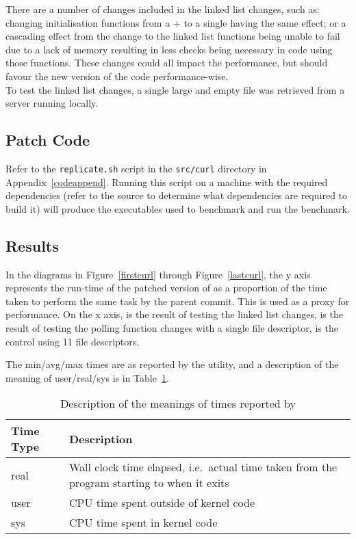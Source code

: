 There are a number of changes included in the linked list changes, such as: changing initialisation functions from a \malloc{}+ to a single  having the same effect; or a cascading effect from the change to the linked list functions being unable to fail due to a lack of memory resulting in less checks being necessary in code using those functions. These changes could all impact the performance, but should favour the new version of the code performance-wise.\\
To test the linked list changes, a single large and empty file was retrieved from a server running locally.

\subsection{Patch Code}

Refer to the \texttt{replicate.sh} script in the \texttt{src/curl} directory in Appendix~\ref{codeappend}. Running this script on a machine with the required dependencies (refer to the  source to determine what dependencies are required to build it) will produce the executables used to benchmark and run the benchmark.

\subsection{Results}

In the diagrams in Figure~\ref{firstcurl} through Figure~\ref{lastcurl}, the y axis represents the run-time of the patched version of  as a proportion of the time taken to perform the same task by the parent commit. This is used as a proxy for performance. On the x axis,  is the result of testing the linked list changes,  is the result of testing the polling function changes with a single file descriptor,  is the control using 11 file descriptors.

The min/avg/max times are as reported by the  utility, and a description of the meaning of user/real/sys is in Table~\ref{timestable}.

\begin{table}
	\centering
	\begin{tabularx}{\linewidth}{>{\hsize=0.6\hsize}X >{\hsize=1.4\hsize}X}
		\toprule
		\textbf{Time Type} & \textbf{Description} \\
		\midrule
		real & Wall clock time elapsed, i.e.\ actual time taken from the program starting to when it exits \\
		user & CPU time spent outside of kernel code \\
		sys & CPU time spent in kernel code \\
		\bottomrule
	\end{tabularx}
	\caption{Description of the meanings of times reported by }\label{timestable}
\end{table}

